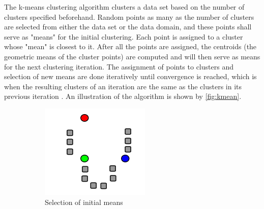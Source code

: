 \documentclass[conference,compsoc]{IEEEtran}
\begin{document}
The k-means clustering algorithm clusters a data set based on the number of clusters specified beforehand. Random points as many as the number of clusters are selected from either the data set or the data domain, and these points shall serve as "means" for the initial clustering. Each point is assigned to a cluster whose "mean" is closest to it. After all the points are assigned, the centroids (the geometric means of the cluster points) are computed and will then serve as means for the next clustering iteration. The assignment of points to clusters and selection of new means are done iteratively until convergence is reached, which is when the resulting clusters of an iteration are the same as the clusters in its previous iteration . An illustration of the algorithm is shown by \hyperref[fig:kmean]{\autoref{fig:kmean}}.
\begin{figure}[htbp]
        \begin{subfigure}{0.23\textwidth}
                \includegraphics[width=\textwidth]{kmean01.png}
                \caption{Selection of initial means}
                \label{fig:kmean01}
        \end{subfigure}
        \begin{subfigure}{0.23\textwidth}

\end{subfigure}
\end{figure}
\end{document}
